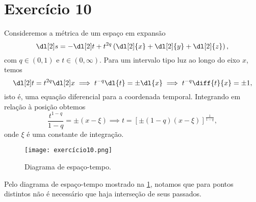 \section*{Exercício 10}
Consideremos a métrica de um espaço em expansão
\begin{equation*}
    \dl[2]s = - \dl[2]t + t^{2q}\left(\dl[2]{x} + \dl[2]{y} + \dl[2]{z}\right),
\end{equation*}
com \(q \in (0,1)\) e \(t \in (0,\infty)\). Para um intervalo tipo luz ao longo do eixo \(x\), temos
\begin{equation*}
    \dl[2]t = t^{2q}\dl[2]x \implies t^{-q} \dl{t} = \pm\dl{x} \implies t^{-q} \diff{t}{x} = \pm 1,
\end{equation*}
isto é, uma equação diferencial para a coordenada temporal. Integrando em relação à posição obtemos
\begin{equation*}
    \frac{t^{1-q}}{1-q} = \pm(x - \xi) \implies t = \left[\pm(1-q)(x - \xi)\right]^{\frac{1}{1-q}},
\end{equation*}
onde \(\xi\) é uma constante de integração.

\begin{figure}[H]
    \centering
    \texttt{[image: exercício10.png]}
    \caption{Diagrama de espaço-tempo.}
    \label{fig:exercício10}
\end{figure}

Pelo diagrama de espaço-tempo mostrado na \cref{fig:exercício10}, notamos que para pontos distintos não é necessário que haja interseção de seus passados.
